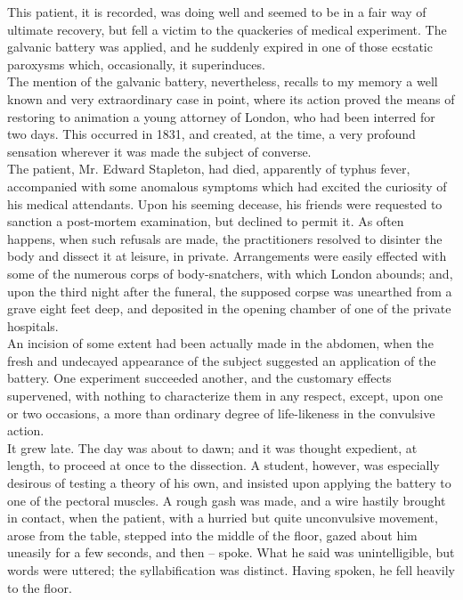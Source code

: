 \documentclass[12pt,a4paper]{article}
\begin{document}
This patient, it is recorded, was doing well and seemed to be in a fair way of ultimate recovery, but fell a victim to the quackeries of medical experiment. The galvanic battery was applied, and he suddenly expired in one of those ecstatic paroxysms which, occasionally, it superinduces. \\

The mention of the galvanic battery, nevertheless, recalls to my memory a well known and very extraordinary case in point, where its action proved the means of restoring to animation a young attorney of London, who had been interred for two days. This occurred in 1831, and created, at the time, a very profound sensation wherever it was made the subject of converse. \\

The patient, Mr. Edward Stapleton, had died, apparently of typhus fever, accompanied with some anomalous symptoms which had excited the curiosity of his medical attendants. Upon his seeming decease, his friends were requested to sanction a post-mortem examination, but declined to permit it. As often happens, when such refusals are made, the practitioners resolved to disinter the body and dissect it at leisure, in private. Arrangements were easily effected with some of the numerous corps of body-snatchers, with which London abounds; and, upon the third night after the funeral, the supposed corpse was unearthed from a grave eight feet deep, and deposited in the opening chamber of one of the private hospitals. \\

An incision of some extent had been actually made in the abdomen, when the fresh and undecayed appearance of the subject suggested an application of the battery. One experiment succeeded another, and the customary effects supervened, with nothing to characterize them in any respect, except, upon one or two occasions, a more than ordinary degree of life-likeness in the convulsive action. \\

It grew late. The day was about to dawn; and it was thought expedient, at length, to proceed at once to the dissection. A student, however, was especially desirous of testing a theory of his own, and insisted upon applying the battery to one of the pectoral muscles. A rough gash was made, and a wire hastily brought in contact, when the patient, with a hurried but quite unconvulsive movement, arose from the table, stepped into the middle of the floor, gazed about him uneasily for a few seconds, and then -- spoke. What he said was unintelligible, but words were uttered; the syllabification was distinct. Having spoken, he fell heavily to the floor. \\
\end{document}
